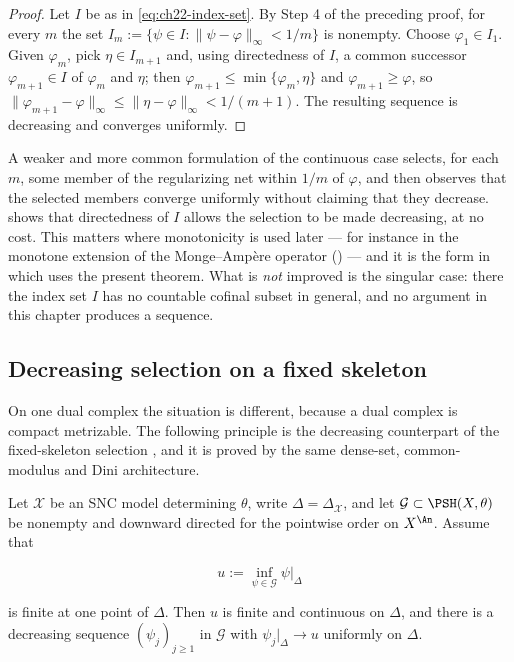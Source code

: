 \begin{proof}
Let $I$ be as in \eqref{eq:ch22-index-set}.  By Step 4 of the preceding
proof, for every $m$ the set
$I_m:=\{\psi\in I:\|\psi-\varphi\|_\infty<1/m\}$ is nonempty.  Choose
$\varphi_1\in I_1$.  Given $\varphi_{m}$, pick $\eta\in I_{m+1}$ and,
using directedness of $I$, a common successor
$\varphi_{m+1}\in I$ of $\varphi_m$ and $\eta$; then
$\varphi_{m+1}\leq\min\{\varphi_m,\eta\}$ and
$\varphi_{m+1}\geq\varphi$, so
$\|\varphi_{m+1}-\varphi\|_\infty\leq\|\eta-\varphi\|_\infty<1/(m+1)$.
The resulting sequence is decreasing and converges uniformly.
\end{proof}

\begin{remark}
\label{rem:ch22-decreasing-selection-improvement}
A weaker and more common formulation of the continuous case selects, for
each $m$, some member of the regularizing net within $1/m$ of
$\varphi$, and then observes that the selected members converge uniformly
without claiming that they decrease.  
shows that directedness of $I$ allows the selection to be made decreasing,
at no cost.  This matters where monotonicity is used later --- for instance
in the monotone extension of the Monge--Amp\`ere operator
() --- and it is the form in which
 uses the present theorem.  What is
\emph{not} improved is the singular case: there the index set $I$ has no
countable cofinal subset in general, and no argument in this chapter
produces a sequence.
\end{remark}

\subsection{Decreasing selection on a fixed skeleton}

On one dual complex the situation is different, because a dual complex is
compact metrizable.  The following principle is the decreasing counterpart
of the fixed-skeleton selection ,
and it is proved by the same dense-set, common-modulus and Dini
architecture.

\begin{proposition}
\label{prop:ch22-fixed-skeleton-decreasing}
Let $\mathcal X$ be an SNC model determining $\theta$, write
$\Delta=\Delta_{\mathcal X}$, and let
$\mathcal G\subset\PSH(X,\theta)$ be nonempty and downward directed for
the pointwise order on $X^{\An}$.  Assume that

\[
 u:=\inf_{\psi\in\mathcal G}\psi|_\Delta
\]

is finite at one point of $\Delta$.  Then $u$ is finite and continuous
on $\Delta$, and there is a decreasing sequence
$(\psi_j)_{j\geq1}$ in $\mathcal G$ with
$\psi_j|_\Delta\to u$ uniformly on $\Delta$.
\end{proposition}

